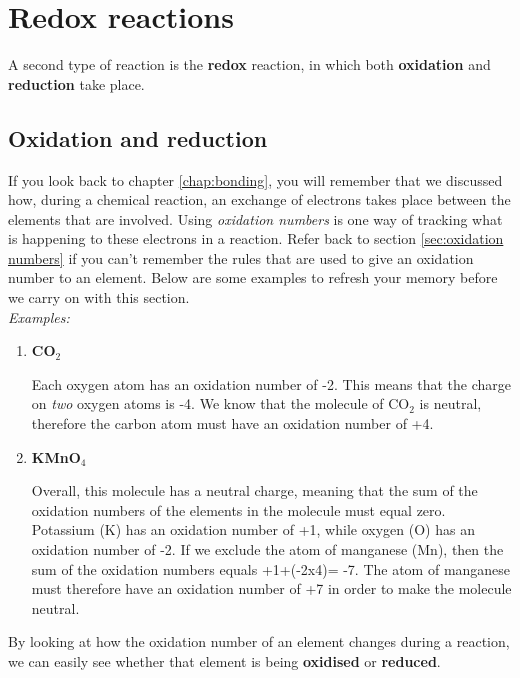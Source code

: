 
\section{Redox reactions}
\label{sec:reactiontypes:redox}

A second type of reaction is the \textbf{redox} reaction, in which both \textbf{oxidation} and \textbf{reduction} take place.

\subsection{Oxidation and reduction}

If you look back to chapter \ref{chap:bonding}, you will remember that we discussed how, during a chemical reaction, an exchange of electrons takes place between the elements that are involved. Using \textit{oxidation numbers} is one way of tracking what is happening to these electrons in a reaction. Refer back to section \ref{sec:oxidation numbers} if you can't remember the rules that are used to give an oxidation number to an element. Below are some examples to refresh your memory before we carry on with this section.\\

\textit{Examples:}

\begin{enumerate}
\item{\textbf{CO$_{2}$}

Each oxygen atom has an oxidation number of -2. This means that the charge on \textit{two} oxygen atoms is -4. We know that the molecule of CO$_{2}$ is neutral, therefore the carbon atom must have an oxidation number of +4.}

\item{\textbf{KMnO$_{4}$}

Overall, this molecule has a neutral charge, meaning that the sum of the oxidation numbers of the elements in the molecule must equal zero. Potassium (K) has an oxidation number of +1, while oxygen (O) has an oxidation number of -2. If we exclude the atom of manganese (Mn), then the sum of the oxidation numbers equals +1+(-2x4)= -7. The atom of manganese must therefore have an oxidation number of +7 in order to make the molecule neutral.\\
}
\end{enumerate}

By looking at how the oxidation number of an element changes during a reaction, we can easily see whether that element is being \textbf{oxidised} or \textbf{reduced}.


